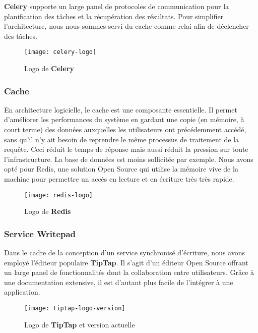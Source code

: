 \textbf{Celery} supporte un large panel de protocoles de communication pour la planification des tâches et la récupération des résultats. 
Pour simplifier l’architecture, nous nous sommes servi du cache comme relai afin de déclencher des tâches.


\begin{figure}[H]
  \centering
  \texttt{[image: celery-logo]}
  \caption{Logo de \textbf{Celery}}
  \label{fig:celery_logo}
\end{figure}


\subsubsection{Cache}
En architecture logicielle, le cache est une composante essentielle. 
Il permet d'améliorer les performances du système en gardant une copie 
(en mémoire, à court terme) des données auxquelles les utilisateurs ont précédemment accédé,
sans qu’il n’y ait besoin de reprendre le même processus de traitement de la requête. 
Ceci réduit le temps de réponse mais aussi réduit la pression sur toute l’infrastructure. 
La base de données est moins sollicitée par exemple. Nous avons opté pour Redis, 
une solution Open Source qui utilise la mémoire vive de la machine pour permettre un accès en lecture 
et en écriture très très rapide.


\begin{figure}[H]
  \centering
  \texttt{[image: redis-logo]}
  \caption{Logo de \textbf{Redis}}
  \label{fig:redis_logo}
\end{figure}

\subsubsection{Service Writepad}
Dans le cadre de la conception d’un service synchronisé d'écriture, nous avons employé l'éditeur populaire \textbf{TipTap}. 
Il s’agit d’un éditeur Open Source offrant un large panel de fonctionnalités dont la collaboration entre utilisateurs. 
Grâce à une documentation extensive, il est d’autant plus facile de l'intégrer à une application.

\begin{figure}[H]
  \centering
  \texttt{[image: tiptap-logo-version]}
  \caption{Logo de \textbf{TipTap} et version actuelle}
  \label{fig:tiptap_logo_and_version}
\end{figure}

